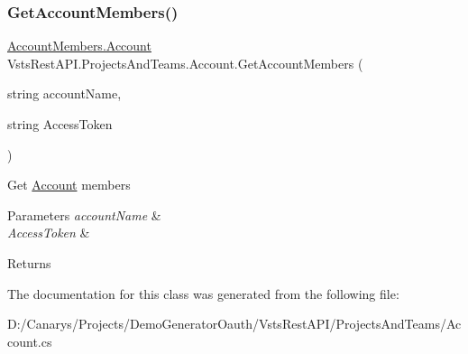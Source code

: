 \subsubsection{\texorpdfstring{Get\+Account\+Members()}{GetAccountMembers()}}
{\footnotesize\ttfamily \mbox{\hyperlink{class_vsts_rest_a_p_i_1_1_viewmodel_1_1_project_and_teams_1_1_account_members_1_1_account}{Account\+Members.\+Account}} Vsts\+Rest\+A\+P\+I.\+Projects\+And\+Teams.\+Account.\+Get\+Account\+Members (\begin{DoxyParamCaption}\item[{string}]{account\+Name,  }\item[{string}]{Access\+Token }\end{DoxyParamCaption})}



Get \mbox{\hyperlink{class_vsts_rest_a_p_i_1_1_projects_and_teams_1_1_account}{Account}} members 


\begin{DoxyParams}{Parameters}
{\em account\+Name} & \\
\hline
{\em Access\+Token} & \\
\hline
\end{DoxyParams}
\begin{DoxyReturn}{Returns}

\end{DoxyReturn}


The documentation for this class was generated from the following file\+:\begin{DoxyCompactItemize}
\item 
D\+:/\+Canarys/\+Projects/\+Demo\+Generator\+Oauth/\+Vsts\+Rest\+A\+P\+I/\+Projects\+And\+Teams/Account.\+cs\end{DoxyCompactItemize}
